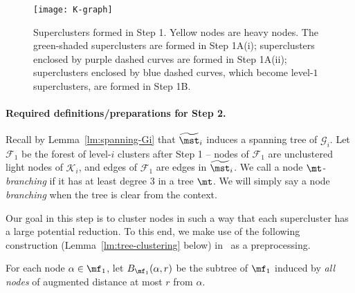 	\begin{wrapfigure}{r}{0.4\textwidth}
	\vspace{-25pt}
	\begin{center}
		\texttt{[image: K-graph]}
	\end{center}
	\caption{\footnotesize{Superclusters formed in Step 1. Yellow nodes are heavy nodes. The green-shaded superclusters are formed in Step 1A(i); superclusters enclosed by purple dashed curves are formed in Step 1A(ii); superclusters enclosed by blue dashed curves, which become level-$1$ superclusters, are formed in Step 1B. }}
	\vspace{-20pt}
	\label{fig:K-graph}
\end{wrapfigure}

\paragraph{Required definitions/preparations for Step 2.~} Recall by Lemma~\ref{lm:spanning-Gi} that $\widetilde{\mst}_i$ induces a spanning tree of $\mathcal{G}_i$. Let $\mathcal{F}_1$ be the forest of level-$i$ clusters after Step 1 -- nodes of $\mathcal{F}_1$ are unclustered light nodes of $\mathcal{K}_i$, and edges of $\mathcal{F}_1$ are edges in $\widetilde{\mst}_i$. We call a node  \emph{$\mt$-branching} if it has at least degree 3 in  a tree $\mt$. We will simply say a node \emph{branching} when the tree is clear from the context. 


Our goal in this step is to cluster nodes in such a way that each supercluster has a large potential reduction. To this end, we make use of the following construction (Lemma~\ref{lm:tree-clustering} below) in~\cite{LS19} as a preprocessing. 

For each node $\alpha\in \mf_1$, let $B_{\mf_1}(\alpha, r)$ be the subtree of $\mf_1$ induced by \emph{all nodes} of augmented distance at most $r$ from $\alpha$. 


